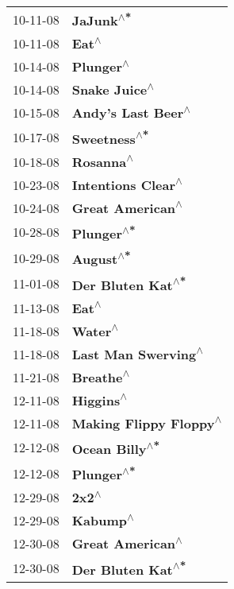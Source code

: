 \begin{supertabular}{p{0.25\columnwidth}p{0.75\columnwidth}}
 10-11-08 &                     \textbf{JaJunk\textsuperscript{$\wedge$*}} \\
 10-11-08 &                         \textbf{Eat\textsuperscript{$\wedge$}} \\
 10-14-08 &                     \textbf{Plunger\textsuperscript{$\wedge$}} \\
 10-14-08 &                 \textbf{Snake Juice\textsuperscript{$\wedge$}} \\
 10-15-08 &            \textbf{Andy's Last Beer\textsuperscript{$\wedge$}} \\
 10-17-08 &                  \textbf{Sweetness\textsuperscript{$\wedge$*}} \\
 10-18-08 &                     \textbf{Rosanna\textsuperscript{$\wedge$}} \\
 10-23-08 &            \textbf{Intentions Clear\textsuperscript{$\wedge$}} \\
 10-24-08 &              \textbf{Great American\textsuperscript{$\wedge$}} \\
 10-28-08 &                    \textbf{Plunger\textsuperscript{$\wedge$*}} \\
 10-29-08 &                     \textbf{August\textsuperscript{$\wedge$*}} \\
 11-01-08 &             \textbf{Der Bluten Kat\textsuperscript{$\wedge$*}} \\
 11-13-08 &                         \textbf{Eat\textsuperscript{$\wedge$}} \\
 11-18-08 &                       \textbf{Water\textsuperscript{$\wedge$}} \\
 11-18-08 &           \textbf{Last Man Swerving\textsuperscript{$\wedge$}} \\
 11-21-08 &                     \textbf{Breathe\textsuperscript{$\wedge$}} \\
 12-11-08 &                     \textbf{Higgins\textsuperscript{$\wedge$}} \\
 12-11-08 &        \textbf{Making Flippy Floppy\textsuperscript{$\wedge$}} \\
 12-12-08 &                \textbf{Ocean Billy\textsuperscript{$\wedge$*}} \\
 12-12-08 &                    \textbf{Plunger\textsuperscript{$\wedge$*}} \\
 12-29-08 &                         \textbf{2x2\textsuperscript{$\wedge$}} \\
 12-29-08 &                      \textbf{Kabump\textsuperscript{$\wedge$}} \\
 12-30-08 &              \textbf{Great American\textsuperscript{$\wedge$}} \\
 12-30-08 &             \textbf{Der Bluten Kat\textsuperscript{$\wedge$*}} \\
\end{supertabular}
